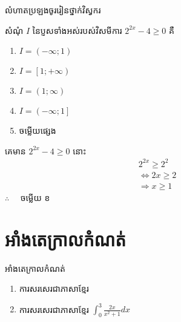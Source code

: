 \documentclass[12pt,xetex,serif]{beamer}
\begin{document}
    \begin{frame}{លំហាតប្រឡងចូររៀនថ្នាក់វិស្វករ}
    	\pause
    	\begin{example}
    		\kb សំណុំ $I$ នៃប្ញសទាំងអស់របស់វិសមីការ $2^{2x}-4\ge0$ គឺ
    		\begin{multicols}{3}
    			\begin{enumerate}[a]
    				\item $I=\left(-\infty;1\right)$
    				\item $I=\left[1;+\infty\right)$
    				\item $I=\left(1;\infty\right)$
    				\item $I=\left(-\infty;1\right]$
    				\item ចម្លើយផ្សេង
    			\end{enumerate}
    		\end{multicols}
    	\end{example}
    	\pause
    	\centering \kml{\answername}\kb
    	\pause
    		\begin{center}
    			គេមាន $2^{2x}-4\ge0$ នោះ
    			\begin{align*}
    			2^{2x} \ge 2^{2}\\
    			\Leftrightarrow 2x \ge 2\\
    			\Rightarrow x\ge1
    			\end{align*}
    			$\therefore \quad$ \kml ចម្លើយ \kbk ខ
    		\end{center}
    \end{frame}
    \section{អាំងតេក្រាលកំណត់}
    \begin{frame}{អាំងតេក្រាលកំណត់}
        \begin{example}
        	\kb
            \begin{enumerate}[a]
            	\item ការសរសេរជាភាសាខ្មែរ
            	\item ការសរសេរជាភាសាខ្មែរ
            	$\int_{0}^{3}\frac{2x}{x^2+1}dx$
            \end{enumerate}
        \end{example}
    \end{frame}
    \begin{frame}{\bibname}
    	
    \end{frame}
\end{document}
